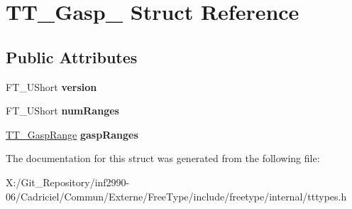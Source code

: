 \hypertarget{struct_t_t___gasp__}{\section{T\-T\-\_\-\-Gasp\-\_\- Struct Reference}
\label{struct_t_t___gasp__}
}
\subsection*{Public Attributes}
\begin{DoxyCompactItemize}
\item 
\hypertarget{struct_t_t___gasp___a0166777999a11a32068418ed6cf0caf8}{F\-T\-\_\-\-U\-Short {\bfseries version}}\label{struct_t_t___gasp___a0166777999a11a32068418ed6cf0caf8}

\item 
\hypertarget{struct_t_t___gasp___a03f6dc693ebee0fedc055ac0981ee776}{F\-T\-\_\-\-U\-Short {\bfseries num\-Ranges}}\label{struct_t_t___gasp___a03f6dc693ebee0fedc055ac0981ee776}

\item 
\hypertarget{struct_t_t___gasp___a50240e84cfd7fc79ae1f2996ecb2a5d1}{\hyperlink{struct_t_t___gasp_range_rec__}{T\-T\-\_\-\-Gasp\-Range} {\bfseries gasp\-Ranges}}\label{struct_t_t___gasp___a50240e84cfd7fc79ae1f2996ecb2a5d1}

\end{DoxyCompactItemize}


The documentation for this struct was generated from the following file\-:\begin{DoxyCompactItemize}
\item 
X\-:/\-Git\-\_\-\-Repository/inf2990-\/06/\-Cadriciel/\-Commun/\-Externe/\-Free\-Type/include/freetype/internal/tttypes.\-h\end{DoxyCompactItemize}

